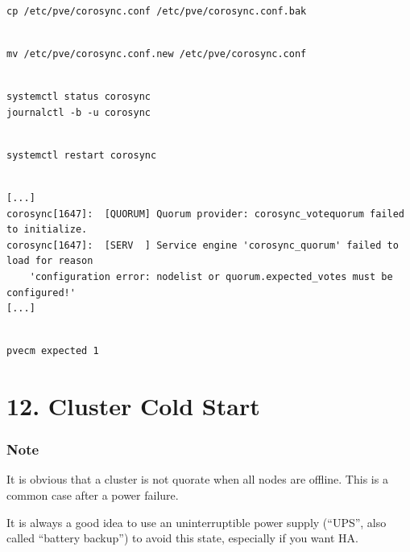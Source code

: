 \begin{lstlisting}

cp /etc/pve/corosync.conf /etc/pve/corosync.conf.bak

\end{lstlisting}

\begin{lstlisting}

mv /etc/pve/corosync.conf.new /etc/pve/corosync.conf

\end{lstlisting}

\begin{lstlisting}

systemctl status corosync
journalctl -b -u corosync

\end{lstlisting}

\begin{lstlisting}

systemctl restart corosync

\end{lstlisting}

\begin{lstlisting}

[...]
corosync[1647]:  [QUORUM] Quorum provider: corosync_votequorum failed to initialize.
corosync[1647]:  [SERV  ] Service engine 'corosync_quorum' failed to load for reason
    'configuration error: nodelist or quorum.expected_votes must be configured!'
[...]

\end{lstlisting}

\begin{lstlisting}

pvecm expected 1

\end{lstlisting}


\section{12. Cluster Cold Start}

\subsubsection{Note}

It is obvious that a cluster is not quorate when all nodes are offline. This is a common case after a power failure.

It is always a good idea to use an uninterruptible power supply (“UPS”, also called “battery backup”) to avoid this state, especially if you want HA.

